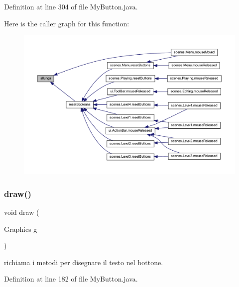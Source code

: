 Definition at line 304 of file My\+Button.\+java.

Here is the caller graph for this function\+:\nopagebreak
\begin{figure}[H]
\begin{center}
\leavevmode
\includegraphics[width=350pt]{classui_1_1_my_button_a38b44562c6a3dd438f51365e248c7e57_icgraph}
\end{center}
\end{figure}
\mbox{\label{classui_1_1_my_button_a72fe1ffca978e99fd16994a10e7f8051}} 
\subsubsection{\texorpdfstring{draw()}{draw()}}
{\footnotesize\ttfamily void draw (\begin{DoxyParamCaption}\item[{Graphics}]{g }\end{DoxyParamCaption})}



richiama i metodi per disegnare il testo nel bottone. 



Definition at line 182 of file My\+Button.\+java.

